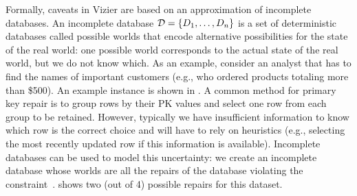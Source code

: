 Formally, caveats in Vizier are based on an approximation of incomplete databases. An incomplete database $\mathcal{D} = \{D_1, \ldots, D_n\}$ is a set of deterministic databases called possible worlds that encode alternative possibilities for the state of the real world: one possible world corresponds to the actual state of the real world, but we do not know which. 
As an example, consider an analyst that has to find the names of important customers (e.g., who ordered products totaling more than \$500). 
An example instance is shown in . 
A common method for primary key repair is to group rows by their PK values and select one row from each group to be retained. 
However, typically we have insufficient information to know which row is the correct choice and will have to rely on heuristics (e.g., selecting the most recently updated row if this information is available). 
Incomplete databases can be used to model this uncertainty: we create an incomplete database whose worlds are all the repairs of the database violating the constraint~\cite{DBLP:journals/vldb/BeskalesIGG14}.
 shows two (out of 4) possible repairs for this dataset.

